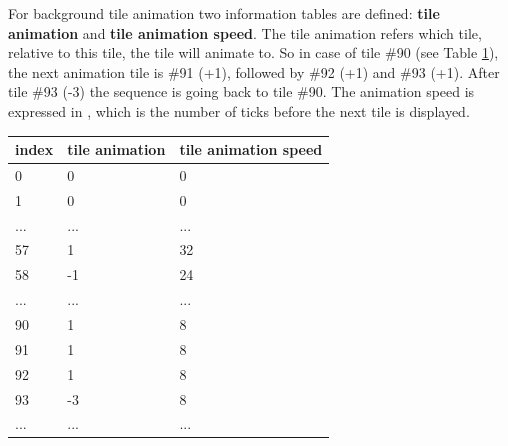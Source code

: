 \documentclass[book.tex]{subfiles}
\begin{document}
For background tile animation two information tables are defined: \textbf{tile animation} and \textbf{tile animation speed}. The tile animation refers which tile, relative to this tile, the tile will animate to. So in case of tile \#90 (see Table \ref{table:background tile anim}), the next animation tile is \#91 (+1), followed by \#92 (+1) and \#93 (+1). After tile \#93 (-3) the sequence is going back to tile \#90. The animation speed is expressed in , which is the number of ticks before the next tile is displayed. \\
 \begin{table}[H]
  \begin{tabularx}{\textwidth}[c]{XXX}
  \hline
  \textbf{index} & \textbf{tile animation} & \textbf{tile animation speed}   \\ \hline
  0             & 0          & 0    \\
  1             & 0          & 0    \\
  ...             & ...          & ...    \\
  57             & 1          & 32    \\
  58             & -1          & 24    \\
  ...             & ...          & ...    \\
  90             & 1          & 8    \\
  91            & 1          & 8    \\
  92             & 1          & 8    \\
  93             & -3          & 8    \\
  ...             & ...          & ...    \\
  \end{tabularx}
  \label{table:background tile anim}
  \end{table}
  
\end{document}
